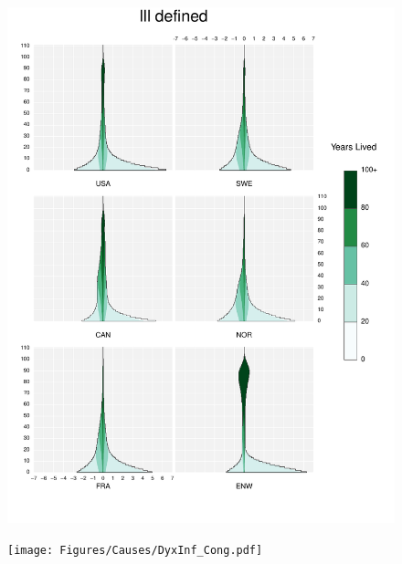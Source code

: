 \documentclass{article}
\begin{document}
\begin{appendices}
\begin{figure}
\includegraphics[scale=.8]{Figures/Causes/DyxIll defined.pdf}
\end{figure}
\begin{figure}
\centering
\texttt{[image: Figures/Causes/DyxInf\_Cong.pdf]}
\end{figure}
\begin{figure}
\centering

\end{figure}
\end{appendices}
\end{document}
